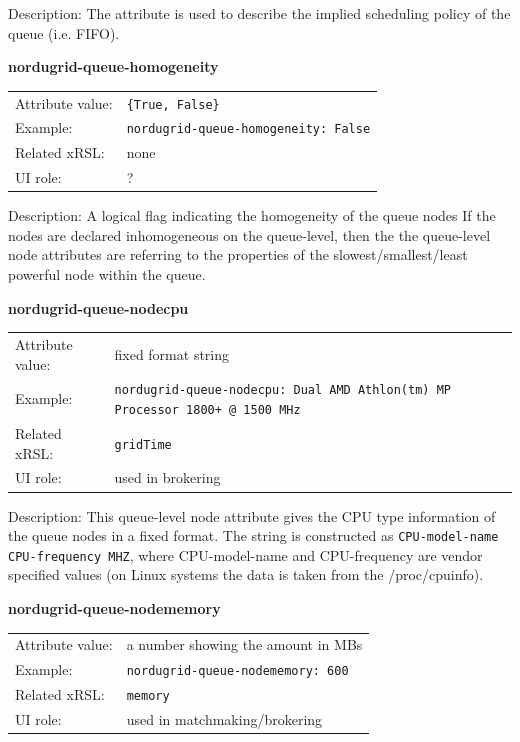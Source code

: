 \documentclass{article}
\begin{document}
Description: 
The attribute is used to describe the implied scheduling policy of the queue (i.e. FIFO).


  \hspace*{0.5cm}
  \begin{shaded}
    \textbf{nordugrid-queue-homogeneity}
  \end{shaded}
  \begin{tabular}{lp{10cm}}  
    Attribute value:& \verb#{True, False}#\\
    Example:& \verb#nordugrid-queue-homogeneity: False#\\
    Related xRSL:& none\\
    UI role:& ?\\
  \end{tabular}

Description: 
A logical flag indicating the homogeneity of the queue nodes
If the nodes are declared inhomogeneous on the queue-level, then the 
the queue-level node attributes are referring to the properties of the 
slowest/smallest/least powerful node within the queue.


  \hspace*{0.5cm}
  \begin{shaded}
    \textbf{nordugrid-queue-nodecpu}
  \end{shaded}
  \begin{tabular}{lp{10cm}}  
    Attribute value:& fixed format string\\
    Example:& \verb#nordugrid-queue-nodecpu: Dual AMD Athlon(tm) MP Processor 1800+ @ 1500 MHz#\\
    Related xRSL:& \verb#gridTime#\\
    UI role:& used in brokering \\
  \end{tabular}

Description: This queue-level node attribute gives the CPU type information of the queue nodes
in a fixed format. The string is constructed as \verb#CPU-model-name CPU-frequency MHZ#,
where CPU-model-name and CPU-frequency are vendor specified values (on Linux systems 
the data is taken from the /proc/cpuinfo).


  \hspace*{0.5cm}
  \begin{shaded}
    \textbf{nordugrid-queue-nodememory}
  \end{shaded}
  \begin{tabular}{lp{10cm}}  
    Attribute value:& a number showing the amount in MBs\\
    Example:& \verb#nordugrid-queue-nodememory: 600#\\
    Related xRSL:& \verb#memory#\\
    UI role:& used in matchmaking/brokering\\
  \end{tabular}
\end{document}
